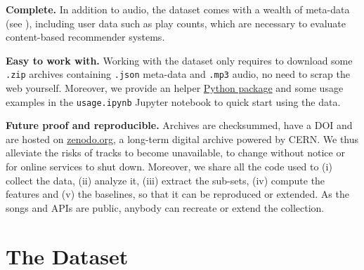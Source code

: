 \documentclass{article}
\begin{document}
\textbf{Complete.} In addition to audio, the dataset comes with a wealth of meta-data (see ), including user data such as play counts, which are necessary to evaluate content-based recommender systems.

\textbf{Easy to work with.} Working with the dataset only requires to download some \texttt{.zip} archives containing \texttt{.json} meta-data and \texttt{.mp3} audio, no need to scrap the web yourself. Moreover, we provide an helper \href{https://pypi.python.org/pypi/freemusicarchive}{Python package} and some usage examples in the \texttt{usage.ipynb} Jupyter notebook to quick start using the data.

\textbf{Future proof and reproducible.} Archives are checksummed, have a DOI and are hosted on \href{https://zenodo.org}{zenodo.org}, a long-term digital archive powered by CERN. We thus alleviate the risks of tracks to become unavailable, to change without notice or for online services to shut down.
Moreover, we share all the code used to (i) collect the data, (ii) analyze it, (iii) extract the sub-sets, (iv) compute the features and (v) the baselines, so that it can be reproduced or extended. As the songs and APIs are public, anybody can recreate or extend the collection.




\section{The Dataset} %
\end{document}
